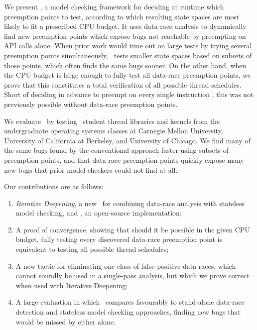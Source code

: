 We present \quicksand,
a model checking framework for deciding at runtime which preemption points to test,
according to which resulting state spaces are most likely to fit a prescribed CPU budget.
It uses data-race analysis \cite{eraser} to dynamically find new preemption points which expose bugs not reachable by preempting on API calls alone.
When prior work would time out on large tests by trying several preemption points simultaneously,
\quicksand~tests smaller state spaces based on subsets of those points, which often finds the same bugs sooner.
On the other hand, when the CPU budget is large enough to fully test all data-race preemption points,
we prove that this constitutes a total verification of all possible thread schedules.
Short of deciding in advance to preempt on every single instruction \cite{spin}, this was not previously possible without data-race preemption points.

We evaluate \quicksand~by testing \numstudence~student thread libraries and kernels from the undergraduate operating systems classes at Carnegie Mellon University, University of California at Berkeley, and University of Chicago.
We find many of the same bugs found by the conventional approach faster using subsets of preemption points,
and that data-race preemption points quickly expose many new bugs that prior model checkers could not find at all.

Our contributions are as follows:
\begin{enumerate}
	\item {\em Iterative Deepening}, a new ~for combining data-race analysis with stateless model checking, and \quicksand, an open-source implementation;
	\item A proof of convergence, showing that should it be possible in the given CPU budget,
		fully testing every discovered data-race preemption point is equivalent to testing all possible thread schedules;
	\item A new tactic for eliminating one class of false-positive data races,
		which cannot soundly be used in a single-pass analysis,
		but which we prove correct when used with Iterative Deepening;
	\item A large evaluation in which \quicksand~compares favourably to stand-alone data-race detection and stateless model checking approaches, finding new bugs that would be missed by either alone.
\end{enumerate}

